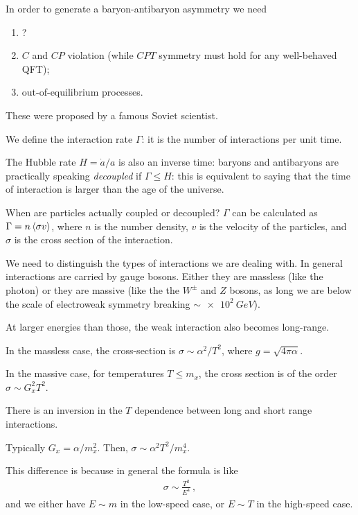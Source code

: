 \documentclass[main.tex]{subfiles}
\begin{document}
In order to generate a baryon-antibaryon asymmetry we need \begin{enumerate}
    \item ?
    \item \(C\) and \(CP\) violation (while \(CPT\) symmetry must hold for any well-behaved QFT);
    \item out-of-equilibrium processes.
\end{enumerate}

These were proposed by a famous Soviet scientist.

We define the interaction rate \(\Gamma \): it is the number of interactions per unit time.

The Hubble rate \(H = \dot{a} / a \) is also an inverse time: baryons and antibaryons are practically speaking \emph{decoupled} if \(\Gamma \leq H\): this is equivalent to saying that the time of interaction is larger than the age of the universe.

When are particles actually coupled or decoupled?
\(\Gamma \) can be calculated as \(\Gamma = n \expval{\sigma v}\), where \(n\) is the number density, \(v\) is the velocity of the particles, and \(\sigma \) is the cross section of the interaction.

We need to distinguish the types of interactions we are dealing with.
In general interactions are carried by gauge bosons. 
Either they are massless (like the photon) or they are massive (like the the \(W^{\pm}\) and \(Z\) bosons, as long we are below the scale of electroweak symmetry breaking \(\sim \SI{e2}{GeV}\)).

At larger energies than those, the weak interaction also becomes long-range.

In the massless case, the cross-section is \(\sigma \sim \alpha^2 / T^2\), where \(g = \sqrt{4 \pi \alpha }\).

In the massive case, for temperatures \(T \leq m_{x}\), the cross section is of the order \(\sigma \sim G_x^2 T^2\).

There is an inversion in the \(T\) dependence between long and short range interactions.

Typically \(G_x = \alpha / m_x^2\).  Then, \(\sigma \sim \alpha^2 T^2 / m_x^{4}\).

This difference is because in general the formula is like 
%
\begin{align}
  \sigma \sim \frac{T^{2}}{E^{4}}
\,,
\end{align}
%
and we either have \(E \sim m\) in the low-speed case, or \(E \sim T\) in the high-speed case.
\end{document}

